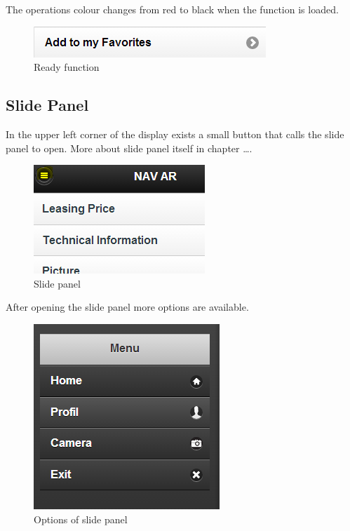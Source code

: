The operations colour changes from red to black when the function is loaded.
\\
\begin{figure}[h]
\centering
\includegraphics[width=0.6\linewidth]{graphics/chapter4/12}
\caption{Ready function}
\label{fig:13}
\end{figure}


\subsection{Slide Panel}
In the upper left corner of the display exists a small button that calls the slide panel to open. More about slide panel itself in chapter ….
\\

\begin{figure}[h]
\centering
\includegraphics[width=0.4\linewidth]{graphics/chapter4/13}
\caption{Slide panel}
\label{fig:14}
\end{figure}

After opening the slide panel more options are available. 
\\

\begin{figure}[h]
\centering
\includegraphics[width=0.4\linewidth]{graphics/chapter4/14}
\caption{Options of slide panel}
\label{fig:15}
\end{figure}
\newpage

